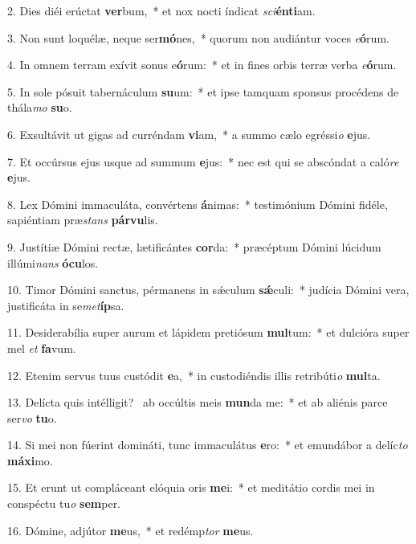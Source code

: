 2. Dies diéi erúctat \textbf{ver}bum,~*  et nox nocti índicat \textit{sci}\textbf{én}\textbf{ti}am.\

3. Non sunt loquélæ, neque ser\textbf{mó}nes,~*  quorum non audiántur voces \textit{e}\textbf{ó}rum.\

4. In omnem terram exívit sonus e\textbf{ó}rum:~*  et in fines orbis terræ verba \textit{e}\textbf{ó}rum.\

5. In sole pósuit tabernáculum \textbf{su}um:~*  et ipse tamquam sponsus procédens de thála\textit{mo} \textbf{su}o.\

6. Exsultávit ut gigas ad curréndam \textbf{vi}am,~*  a summo cælo egréssi\textit{o} \textbf{e}jus.\

7. Et occúrsus ejus usque ad summum \textbf{e}jus:~*  nec est qui se abscóndat a caló\textit{re} \textbf{e}jus.\

8. Lex Dómini immaculáta, convértens \textbf{á}nimas:~*  testimónium Dómini fidéle, sapiéntiam præ\textit{stans} \textbf{pár}\textbf{vu}lis.\

9. Justítiæ Dómini rectæ, lætificántes \textbf{cor}da:~*  præcéptum Dómini lúcidum illúmi\textit{nans} \textbf{ó}\textbf{cu}los.\

10. Timor Dómini sanctus, pérmanens in sǽculum \textbf{sǽ}culi:~*  judícia Dómini vera, justificáta in se\textit{met}\textbf{íp}sa.\

11. Desiderabília super aurum et lápidem pretiósum \textbf{mul}tum:~*  et dulcióra super mel \textit{et} \textbf{fa}vum.\

12. Etenim servus tuus custódit \textbf{e}a,~*  in custodiéndis illis retribúti\textit{o} \textbf{mul}ta.\

13. Delícta quis intélligit? \dag\  ab occúltis meis \textbf{mun}da me:~*  et ab aliénis parce ser\textit{vo} \textbf{tu}o.\

14. Si mei non fúerint domináti, tunc immaculátus \textbf{e}ro:~*  et emundábor a delíc\textit{to} \textbf{má}\textbf{xi}mo.\

15. Et erunt ut compláceant elóquia oris \textbf{me}i:~*  et meditátio cordis mei in conspéctu tu\textit{o} \textbf{sem}per.\

16. Dómine, adjútor \textbf{me}us,~*  et redémp\textit{tor} \textbf{me}us.\

